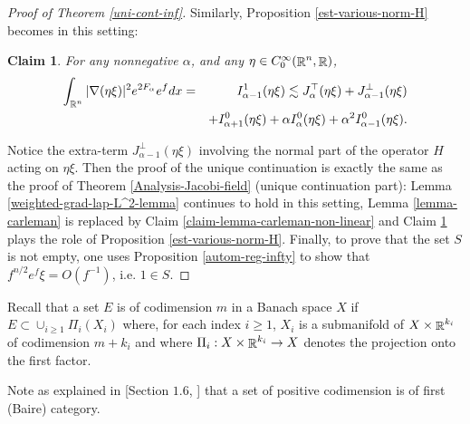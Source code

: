 \documentclass[a4paper,11pt,reqno]{amsart}
\newtheorem{claim}{Claim}
\def\R{\mathop{\rm \mathbb{R}}\nolimits}
\begin{document}
\begin{proof}[Proof of Theorem \ref{uni-cont-inf}]
 Similarly, Proposition \ref{est-various-norm-H} becomes in this setting:
 \begin{claim}\label{est-various-norm-H-nonlin}
For any nonnegative $\alpha$, and any $\eta\in C^{\infty}_0(\R^n,\R)$,
\begin{eqnarray}
\int_{\R^n}|\nabla (\eta\xi)|^2e^{2F_{\alpha}}e^fdx&=&I^1_{\alpha-1}(\eta\xi)\lesssim J^{\top}_{\alpha}(\eta\xi)+J^{\perp}_{\alpha-1}(\eta\xi)\\
&&+I^0_{\alpha+1}(\eta\xi)+\alpha I^0_{\alpha}(\eta\xi)+\alpha^2 I^0_{\alpha-1}(\eta\xi).\label{est-various-norm-H-inequ-nonlin}
\end{eqnarray}

 \end{claim}
Notice the extra-term $J^{\perp}_{\alpha-1}(\eta\xi)$ involving the normal part of the operator $H$ acting on $\eta\xi$.
Then the proof of the unique continuation is exactly the same as the proof of Theorem \ref{Analysis-Jacobi-field} (unique continuation part): Lemma \ref{weighted-grad-lap-L^2-lemma} continues to hold in this setting, Lemma \ref{lemma-carleman} is replaced by Claim \ref{claim-lemma-carleman-non-linear} and Claim \ref{est-various-norm-H-nonlin} plays the role of Proposition \ref{est-various-norm-H}. Finally, to prove that the set $S$ is not empty, one uses Proposition \ref{autom-reg-infty} to show that $f^{n/2}e^f\xi=\textit{O}(f^{-1})$, i.e. $1\in S$.


\end{proof}


Recall that a set $E$ is of codimension $m$ in a Banach space $X$ if $E\subset\cup_{i\geq 1}\Pi_i(X_i)$ where, for each index $i\geq 1$, $X_i$ is a submanifold of $X\times\R^{k_i}$ of codimension $m+k_i$ and where $\Pi_i: X\times\R^{k_i}\rightarrow X$ denotes the projection onto the first factor. 

Note as explained in [Section $1.6$, \cite{Whi-para-ell-fct}] that a set of positive codimension is of first (Baire) category.
\end{document}
